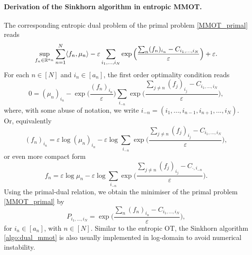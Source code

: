 \paragraph{Derivation of the Sinkhorn algorithm in entropic MMOT.} The corresponding entropic dual problem of the primal problem
\ref{MMOT_primal} reads
\begin{equation}
  \sup_{f_n \in \mathbb R^{a_n}} \sum_{n=1}^N \langle f_n, \mu_n \rangle -
  \varepsilon \sum_{i_1,...,i_N} \exp\Big( \frac{\sum_n (f_n)_{i_n} - C_{i_1,...,i_N}}{\varepsilon} \Big) + \varepsilon.
\end{equation}
For each $n \in [N]$ and $i_n \in [a_n]$, the first order optimality condition reads
\begin{equation}
  0 = (\mu_n)_{i_n} - \exp\big( \frac{(f_n)_{i_n}}{\varepsilon} \big)
  \sum_{i_{-n}} \exp\Big( \frac{\sum_{j \neq n} (f_j)_{i_j} - C_{i_1,...,i_N}}{\varepsilon} \Big),
\end{equation}
where, with some abuse of notation, we write $i_{-n} = (i_1, ..., i_{n-1}, i_{n+1}, ..., i_N)$. Or, equivalently
\begin{equation}
  (f_n)_{i_n} = \varepsilon \log (\mu_n)_{i_n} - \varepsilon \log \sum_{i_{-n}}
  \exp\Big( \frac{\sum_{j \neq n} (f_j)_{i_j} - C_{i_1,...,i_N}}{\varepsilon} \Big),
\end{equation}
or even more compact form
\begin{equation}
  f_n = \varepsilon \log \mu_n - \varepsilon \log \sum_{i_{-n}}
  \exp\Big( \frac{\sum_{j \neq n} (f_j)_{i_j} - C_{\cdot, i_{-n}}}{\varepsilon} \Big).
\end{equation}
Using the primal-dual relation, we obtain the minimiser of the primal problem \ref{MMOT_primal} by
\begin{equation}
  P_{i_1,...,i_N} = \exp\Big( \frac{\sum_n (f_n)_{i_n} - C_{i_1,...,i_N}}{\varepsilon} \Big),
\end{equation}
for $i_n \in [a_n]$, with $n \in [N]$.
Similar to the entropic OT, the Sinkhorn algorithm \ref{algo:dual_mmot} is also usually implemented in log-domain to avoid numerical instability.
